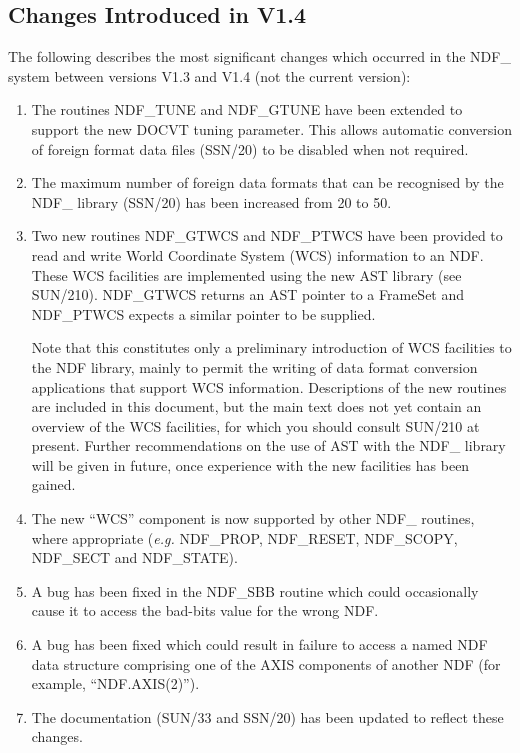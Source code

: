 \documentclass[twoside,11pt]{article}
\newcommand{\htmlref}[2]{#1}
\newcommand{\xref}[3]{#1}
\newcommand{\st}[1]{{\em{#1}}}
\begin{document}
\subsection{Changes Introduced in V1.4}

The following describes the most significant changes which occurred in
the NDF\_ system between versions V1.3 and V1.4 (not the current
version):

\begin{enumerate}

\item The routines \htmlref{NDF\_TUNE}{NDF_TUNE} and
\htmlref{NDF\_GTUNE}{NDF_GTUNE} have been extended to support the new
DOCVT tuning parameter. This allows automatic conversion of foreign
format data files (\xref{SSN/20}{ssn20}{}) to be disabled when not
required.

\item The maximum number of foreign data formats that can be
recognised by the NDF\_ library (\xref{SSN/20}{ssn20}{}) has been
increased from 20 to 50.

\item Two new routines \htmlref{NDF\_GTWCS}{NDF_GTWCS} and
\htmlref{NDF\_PTWCS}{NDF_PTWCS} have been provided to read and write
World Coordinate System (WCS) information to an NDF. These WCS
facilities are implemented using the new AST library (see
\xref{SUN/210}{sun210}{}).  NDF\_GTWCS returns an AST pointer to a
\xref{FrameSet}{sun210}{FrameSet} and NDF\_PTWCS expects a similar
pointer to be supplied.

Note that this constitutes only a preliminary introduction of WCS
facilities to the NDF library, mainly to permit the writing of data
format conversion applications that support WCS information.
Descriptions of the new routines are included in this document, but
the main text does not yet contain an overview of the WCS facilities,
for which you should consult SUN/210 at present. Further
recommendations on the use of AST with the NDF\_ library will be given
in future, once experience with the new facilities has been gained.

\item The new ``WCS'' component is now supported by other NDF\_
routines, where appropriate (\st{e.g.\/}
\htmlref{NDF\_PROP}{NDF_PROP}, \htmlref{NDF\_RESET}{NDF_RESET},
\htmlref{NDF\_SCOPY}{NDF_SCOPY}, \htmlref{NDF\_SECT}{NDF_SECT} and
\htmlref{NDF\_STATE}{NDF_STATE}).

\item A bug has been fixed in the \htmlref{NDF\_SBB}{NDF_SBB}
routine which could occasionally cause it to access the bad-bits value
for the wrong NDF.

\item A bug has been fixed which could result in failure to access a
named NDF data structure comprising one of the AXIS components of
another NDF (for example, ``NDF.AXIS(2)'').

\item The documentation (\xref{SUN/33}{sun33}{} and
\xref{SSN/20}{ssn20}{}) has been updated to reflect these changes.

\end{enumerate}
\end{document}
